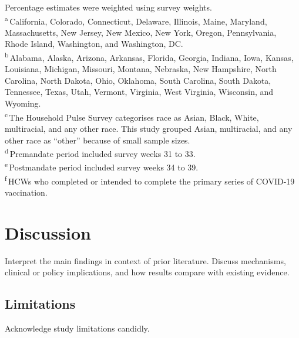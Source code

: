 \documentclass[10pt, letterpaper]{article}
\begin{document}
\begin{table}[H]
\vspace{4pt}
\begin{flushleft}
\fontsize{7.5}{9.5}\selectfont\rmfamily\color{jamagray}
Percentage estimates were weighted using survey weights.\\[1pt]
\textsuperscript{a}\,California, Colorado, Connecticut, Delaware, Illinois,
  Maine, Maryland, Massachusetts, New Jersey, New Mexico, New York, Oregon,
  Pennsylvania, Rhode Island, Washington, and Washington, DC.\\[1pt]
\textsuperscript{b}\,Alabama, Alaska, Arizona, Arkansas, Florida, Georgia,
  Indiana, Iowa, Kansas, Louisiana, Michigan, Missouri, Montana, Nebraska,
  New Hampshire, North Carolina, North Dakota, Ohio, Oklahoma, South Carolina,
  South Dakota, Tennessee, Texas, Utah, Vermont, Virginia, West Virginia,
  Wisconsin, and Wyoming.\\[1pt]
\textsuperscript{c}\,The Household Pulse Survey categorises race as Asian,
  Black, White, multiracial, and any other race. This study grouped Asian,
  multiracial, and any other race as ``other'' because of small sample sizes.\\[1pt]
\textsuperscript{d}\,Premandate period included survey weeks 31 to 33.\\[1pt]
\textsuperscript{e}\,Postmandate period included survey weeks 34 to 39.\\[1pt]
\textsuperscript{f}\,HCWs who completed or intended to complete the primary
  series of COVID-19 vaccination.
\end{flushleft}

\end{table}


\section*{Discussion}

Interpret the main findings in context of prior literature. Discuss mechanisms,
clinical or policy implications, and how results compare with existing evidence.

\subsection*{Limitations}
Acknowledge study limitations candidly.


\end{document}

